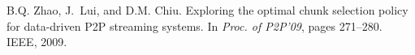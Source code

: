 {\begin{thebibliography}{5}
B.Q. Zhao, J.~Lui, and D.M. Chiu.
\newblock Exploring the optimal chunk selection policy for data-driven {P2P}
  streaming systems.
\newblock In {\em Proc. of P2P'09}, pages 271--280. IEEE, 2009.

\end{thebibliography}


%
%
%
%
%
%
%
%
%
%
}
